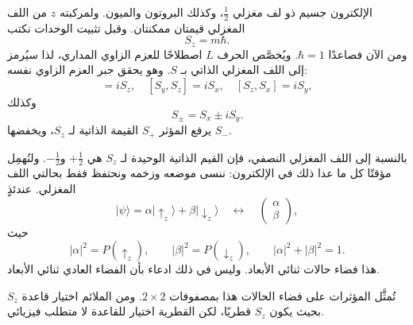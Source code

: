 الإلكترون جسيم ذو لف مغزلي \(\tfrac12\)، وكذلك البروتون والميون. ولمركبته \(z\) من اللف المغزلي قيمتان ممكنتان. وقبل تثبيت الوحدات نكتب
\begin{equation}
S_z=m\hbar.
\end{equation}
ومن الآن فصاعدًا \(\hbar=1\). ويُخصَّص الحرف \(L\) اصطلاحًا للعزم الزاوي المداري، لذا سيُرمز إلى اللف المغزلي الذاتي بـ \(S\). وهو يحقق جبر العزم الزاوي نفسه:
\begin{equation}
[S_x,S_y]=iS_z,
\quad
[S_y,S_z]=iS_x,
\quad
[S_z,S_x]=iS_y,
\end{equation}
وكذلك
\begin{equation}
S_\pm=S_x\pm iS_y.
\end{equation}
يرفع المؤثر \(S_+\) القيمة الذاتية لـ \(S_z\)، ويخفضها \(S_-\).

\begin{classroomqa}
\end{classroomqa}

بالنسبة إلى اللف المغزلي النصفي، فإن القيم الذاتية الوحيدة لـ \(S_z\) هي \(+\tfrac12\) و\(-\tfrac12\). ولنُهمِل مؤقتًا كل ما عدا ذلك في الإلكترون: ننسى موضعه وزخمه ونحتفظ فقط بحالتي اللف المغزلي. عندئذٍ
\begin{equation}
|\psi\rangle
=
\alpha|\uparrow_z\rangle+\beta|\downarrow_z\rangle
\quad\longleftrightarrow\quad
\begin{pmatrix}
\alpha\\
\beta
\end{pmatrix},
\end{equation}
حيث
\begin{equation}
|\alpha|^2=P(\uparrow_z),
\qquad
|\beta|^2=P(\downarrow_z),
\qquad
|\alpha|^2+|\beta|^2=1.
\end{equation}
هذا فضاء حالات ثنائي الأبعاد. وليس في ذلك ادعاء بأن الفضاء العادي ثنائي الأبعاد.

\begin{classroomqa}
\end{classroomqa}

تُمثَّل المؤثرات على فضاء الحالات هذا بمصفوفات \(2\times2\). ومن الملائم اختيار قاعدة \(S_z\) بحيث يكون \(S_z\) قطريًا، لكن القطرية اختيار للقاعدة لا متطلب فيزيائي.

